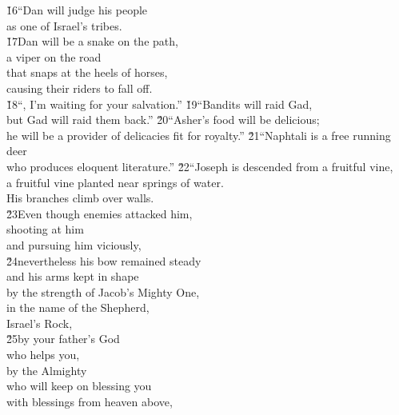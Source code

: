 \begin{poetry}
\poeml \v{16}``Dan will judge his people \\
\poemll    as one of Israel's tribes. \\
\poeml \v{17}Dan will be a snake on the path, \\
\poemll    a viper on the road \\
\poeml that snaps at the heels of horses, \\
\poemll    causing their riders to fall off. \\
\poeml \v{18}``, I'm waiting for your salvation.''
\poeml \v{19}``Bandits will raid Gad, \\
\poemll    but Gad will raid them back.''
\poeml \v{20}``Asher's food will be delicious; \\
\poemll    he will be a provider of delicacies fit for royalty.''
\poeml \v{21}``Naphtali is a free running deer \\
\poemll    who produces eloquent literature.''
\poeml \v{22}``Joseph is descended from a fruitful vine, \\
\poemll    a fruitful vine planted near springs of water. \\
\poemlll       His branches climb over walls. \\
\poeml \v{23}Even though enemies attacked him, \\
\poemll    shooting at him \\
\poemlll       and pursuing him viciously, \\
\poeml \v{24}nevertheless his bow remained steady \\
\poemll    and his arms kept in shape \\
\poemlll       by the strength of Jacob's Mighty One, \\
\poeml in the name of the Shepherd, \\
\poemll    Israel's Rock, \\
\poeml \v{25}by your father's God \\
\poemll    who helps you, \\
\poeml by the Almighty \\
\poemll    who will keep on blessing you \\
\poeml with blessings from heaven above, \\

\end{poetry}
